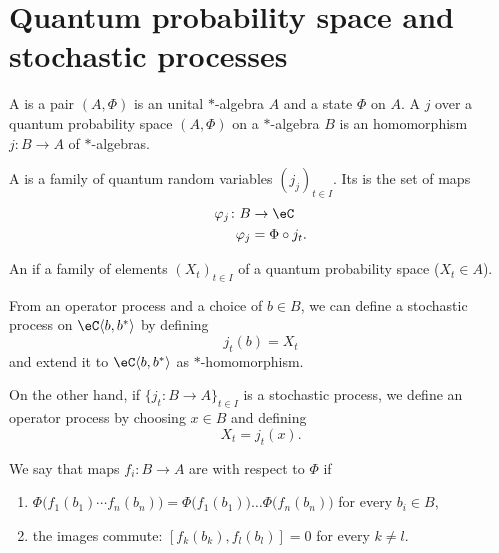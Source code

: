 \section{Quantum probability space and stochastic processes}

\begin{definition}
	A  is a pair $(A,\Phi)$ is an unital $*$-algebra $A$ and a state $\Phi$ on $A$. A  $j$ over a quantum probability space $(A,\Phi)$ on a $*$-algebra $B$ is an homomorphism $j\colon B\to A$ of $*$-algebras.
\end{definition}

\begin{definition}
	A  is a family of quantum random variables $(j_j)_{t\in I}$. Its  is the set of maps
	\begin{equation}
		\begin{aligned}
			\varphi_j\colon B & \to \eC         \\
			\varphi_j         & =\Phi\circ j_t.
		\end{aligned}
	\end{equation}
\end{definition}

\begin{definition}
	An  if a family of elements $(X_t)_{t\in I}$ of a quantum probability space ($X_t\in A$).
\end{definition}

From an operator process and a choice of $b\in B$, we can define a stochastic process on $\eC\langle b,b^*\rangle$ by defining
\begin{equation}
	j_t(b)=X_t
\end{equation}
and extend it to $\eC\langle b,b^*\rangle$ as $*$-homomorphism.

On the other hand, if $\{ j_t\colon B\to A \}_{t\in I}$ is a stochastic process, we define an operator process by choosing $x\in B$ and defining
\begin{equation}
	X_t=j_t(x).
\end{equation}

\begin{definition}
	We say that maps $f_i\colon B\to A$ are  with respect to $\Phi$ if
	\begin{enumerate}
		\item
		      $\Phi\big( f_1(b_1)\cdots f_n(b_n) \big)=\Phi\big( f_1(b_1) \big)\ldots\Phi\big( f_n(b_n) \big)$ for every $b_i\in B$,
		\item
		      the images commute: $[f_k(b_k),f_l(b_l)]=0$ for every $k\neq l$.
	\end{enumerate}
\end{definition}

